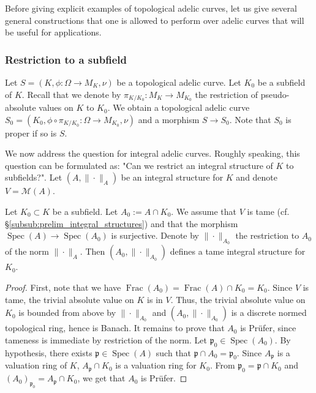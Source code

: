 \documentclass [11pt,reqno]{amsart}
\newcommand{\1}{\mathmybb{1}}
\def\cM{{\mathcal{M}}}
\def\p{\mathfrak p}
\def\Frac{\operatorname{Frac}}
\def\Spec{\operatorname{Spec}}
\begin{document}
Before giving explicit examples of topological adelic curves, let us give several general constructions that one is allowed to perform over adelic curves that will be useful for applications.

\subsubsection{Restriction to a subfield}
\label{subsub:restriction_subfield}

Let $S=(K,\phi:\Omega\to M_K,\nu)$ be a topological adelic curve. Let $K_0$ be a subfield of $K$. Recall that we denote by $\pi_{K/K_0}: M_{K} \to M_{K_{0}}$ the restriction of pseudo-absolute values on $K$ to $K_0$. We obtain a topological adelic curve $S_0=(K_0,\phi\circ\pi_{K/K_0}: \Omega \to M_{K_0},\nu)$ and a morphism $S\to S_{0}$. Note that $S_0$ is proper if so is $S$. 

We now address the question for integral adelic curves. Roughly speaking, this question can be formulated as: "Can we restrict an integral structure of $K$ to subfields?". Let $(A,\|\cdot\|_A)$ be an integral structure for $K$ and denote $V=\cM(A)$.

\begin{proposition}
\label{prop:integral_structure_subfield}
Let $K_0 \subset K$ be a subfield. Let $A_0:= A\cap K_0$. We assume that $V$ is tame (cf. \S \ref{subsub:prelim_integral_structures}) and that the morphism $\Spec(A) \to \Spec(A_0)$ is surjective. Denote by $\|\cdot\|_{A_0}$ the restriction to $A_0$ of the norm $\|\cdot\|_A$. Then $(A_0,\|\cdot\|_{A_0})$ defines a tame integral structure for $K_0$.
\end{proposition}

\begin{proof}
First, note that we have $\Frac(A_0) = \Frac(A)\cap K_0 = K_0$. Since $V$ is tame, the trivial absolute value on $K$ is in $V$. Thus, the trivial absolute value  on $K_0$ is bounded from above by $\|\cdot\|_{A_0}$ and $(A_0,\|\cdot\|_{A_0})$ is a discrete normed topological ring, hence is Banach. It remains to prove that $A_0$ is Prüfer, since tameness is immediate by restriction of the norm. Let $\p_0\in \Spec(A_0)$. By hypothesis, there exists $\p\in\Spec(A)$ such that $\p\cap A_0 = \p_0$. Since $A_{\p}$ is a valuation ring of $K$, $A_{\p} \cap K_0$ is a valuation ring for $K_0$. From $\p_0 = \p \cap K_0$ and $(A_0)_{\p_0} = A_{\p}\cap K_0$, we get that $A_0$ is Prüfer. 
\end{proof}
\end{document}

